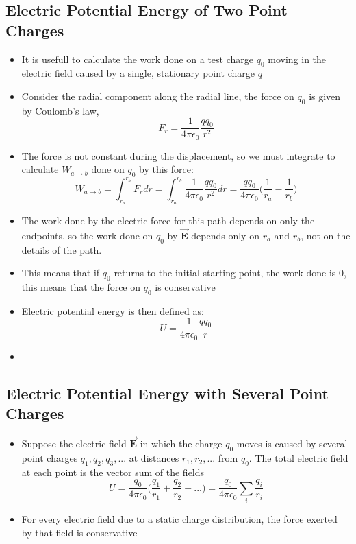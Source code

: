 \documentclass[11pt, a4paper]{article}
\begin{document}
\subsection{Electric Potential Energy of Two Point Charges}
\begin{itemize}
    \item It is usefull to calculate the work done on a test charge $q_0$ moving in the
        electric field caused by a single, stationary point charge $q$
    \item Consider the radial component along the radial line, the force on $q_0$ is
        given by Coulomb's law,
        \begin{equation}
            F_r = \frac{1}{4\pi\epsilon_0}\frac{qq_0}{r^2}
        \end{equation}
    \item The force is not constant during the displacement, so we must integrate to
        calculate $W_{a\rightarrow b}$ done on $q_0$ by this force:
        \begin{equation}
            W_{a\rightarrow b} = \int_{r_a}^{r_b} F_r dr =
            \int_{r_a}^{r_b} \frac{1}{4\pi\epsilon_0} \frac{qq_0}{r^2}dr =
            \frac{qq_0}{4\pi\epsilon_0}\bigg(\frac{1}{r_a}-\frac{1}{r_b}\bigg)
        \end{equation}
    \item The work done by the electric force for this path depends on only the
        endpoints, so the work done on $q_0$ by $\vec{\mathbf{E}}$ depends only on $r_a$
        and $r_b$, not on the details of the path.
    \item This means that if $q_0$ returns to the initial starting point, the work done
        is $0$, this means that the force on $q_0$ is conservative
    \item Electric potential energy is then defined as:
        \begin{equation}
            U = \frac{1}{4\pi\epsilon_0} \frac{qq_0}{r}
        \end{equation}
    \item
\end{itemize}

\subsection{Electric Potential Energy with Several Point Charges}
\begin{itemize}
    \item Suppose the electric field $\vec{\mathbf{E}}$ in which the charge $q_0$ moves
        is caused by several point charges $q_1, q_2, q_3, ...$ at distances
        $r_1, r_2, ...$ from $q_0$. The total electric field at each point is the vector
        sum of the fields
        \begin{equation}
            U = \frac{q_0}{4\pi\epsilon_0}\bigg(\frac{q_1}{r_1} + \frac{q_2}{r_2} + ...  \bigg)
            = \frac{q_0}{4\pi\epsilon_0} \sum_i \frac{q_i}{r_i}
        \end{equation}
    \item For every electric field due to a static charge distribution, the force exerted
        by that field is conservative
\end{itemize}
\end{document}
